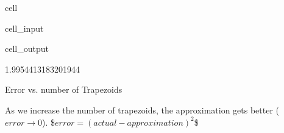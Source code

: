 \documentclass[letterpaper,10pt,english]{jupyterBook}
\begin{document}
\begin{sphinxuseclass}{cell}\begin{sphinxVerbatimInput}

\begin{sphinxuseclass}{cell_input}
\begin{sphinxVerbatim}[commandchars=\\\{\}]
    
 
\end{sphinxVerbatim}

\end{sphinxuseclass}\end{sphinxVerbatimInput}
\begin{sphinxVerbatimOutput}

\begin{sphinxuseclass}{cell_output}
\begin{sphinxVerbatim}[commandchars=\\\{\}]
1.9954413183201944
\end{sphinxVerbatim}

\end{sphinxuseclass}\end{sphinxVerbatimOutput}

\end{sphinxuseclass}
\sphinxAtStartPar
Error vs. number of Trapezoids

\sphinxAtStartPar
As we increase the number of trapezoids, the approximation gets better (\(error \rightarrow 0\)).
\$\(error = (actual - approximation)^2\)\$
\end{document}
